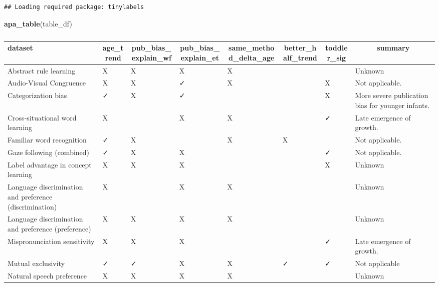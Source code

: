 \documentclass[
]{article}
\newenvironment{Shaded}{\begin{snugshade}}{\end{snugshade}}
\newcommand{\FunctionTok}[1]{\textcolor[rgb]{0.13,0.29,0.53}{\textbf{#1}}}
\newcommand{\NormalTok}[1]{#1}
\begin{document}
\begin{verbatim}
## Loading required package: tinylabels
\end{verbatim}

\begin{Shaded}
\begin{Highlighting}[]
\FunctionTok{apa\_table}\NormalTok{(table\_df)}
\end{Highlighting}
\end{Shaded}

\begin{table}[tbp]

\begin{center}
\begin{threeparttable}

\caption{\label{tab:unnamed-chunk-8}}

\begin{tabular}{llllllll}
\toprule
dataset & \multicolumn{1}{c}{age\_trend} & \multicolumn{1}{c}{pub\_bias\_explain\_wf} & \multicolumn{1}{c}{pub\_bias\_explain\_et} & \multicolumn{1}{c}{same\_method\_delta\_age} & \multicolumn{1}{c}{better\_half\_trend} & \multicolumn{1}{c}{toddler\_sig} & \multicolumn{1}{c}{summary}\\
\midrule
Abstract rule learning & X & X & X & X &  &  & Unknown\\
Audio-Visual Congruence & X & X & ✓ & X &  & X & Not applicable.\\
Categorization bias & ✓ & X & ✓ &  &  & X & More severe publication bias for younger infants.\\
Cross-situational word learning & X &  & X & X &  & ✓ & Late emergence of growth.\\
Familiar word recognition & ✓ & X &  & X & X &  & Not applicable.\\
Gaze following (combined) & ✓ & X & X &  &  & ✓ & Not applicable.\\
Label advantage in concept learning & X & X & X &  &  & X & Unknown\\
Language discrimination and preference (discrimination) & X &  & X & X &  &  & Unknown\\
Language discrimination and preference (preference) & X & X & X & X &  &  & Unknown\\
Mispronunciation sensitivity & X & X & X &  &  & ✓ & Late emergence of growth.\\
Mutual exclusivity & ✓ & ✓ & X & X & ✓ & ✓ & Not applicable\\
Natural speech preference & X & X & X & X &  &  & Unknown\\

\end{tabular}
\end{threeparttable}
\end{center}
\end{table}
\end{document}
